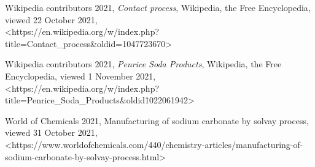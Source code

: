 \documentclass[12pt, a4paper]{article}
\begin{document}
Wikipedia contributors 2021, \emph{Contact process}, Wikipedia, the Free Encyclopedia, viewed 22 October 2021, \\ \textless{https://en.wikipedia.org/w/index.php?title=Contact\_process\&oldid=1047723670}\textgreater

Wikipedia contributors 2021, \emph{Penrice Soda Products}, Wikipedia, the Free Encyclopedia, viewed 1 November 2021, \\ \textless{https://en.wikipedia.org/w/index.php?title=Penrice\_Soda\_Products\&oldid\=1022061942}\textgreater

World of Chemicals 2021, Manufacturing of sodium carbonate by solvay process, viewed 31 October 2021, \\ \textless{https://www.worldofchemicals.com/440/chemistry-articles/manufacturing-of-sodium-carbonate-by-solvay-process.html}\textgreater
\end{document}
